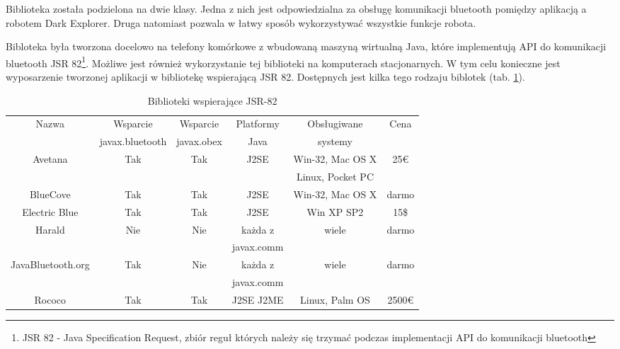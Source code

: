 Biblioteka została podzielona na dwie klasy. Jedna z nich jest odpowiedzialna za obsługę komunikacji bluetooth pomiędzy aplikacją a robotem Dark Explorer. Druga natomiast pozwala w łatwy sposób wykorzystywać wszystkie funkcje robota.

Bibloteka była tworzona docelowo na telefony komórkowe z wbudowaną maszyną wirtualną Java, które implementują API do komunikacji bluetooth JSR 82\footnote{JSR 82 - Java Specification Request, zbiór reguł których należy się trzymać podczas implementacji API do komunikacji bluetooth}. Możliwe jest również wykorzystanie tej biblioteki na komputerach stacjonarnych. W tym celu konieczne jest wyposarzenie tworzonej aplikacji w bibliotekę wspierającą JSR 82. Dostępnych jest kilka tego rodzaju biblotek (tab. \ref{tab:JSR82SDK}).

\begin{table}[hb]
  \centering
  \caption{Biblioteki wspierające JSR-82\cite{website:javabluetooth.com}}
  \begin{tabular}{ | c | c | c | c | c | c |} \hline
    Nazwa & Wsparcie & Wsparcie & Platformy & Obsługiwane & Cena \\
    & javax.bluetooth & javax.obex & Java & systemy & \\ \hline
    Avetana & Tak & Tak & J2SE & Win-32, Mac OS X & 25\euro \\
    & & & & Linux, Pocket PC & \\ \hline
    BlueCove & Tak & Tak & J2SE & Win-32, Mac OS X & darmo \\ \hline
    Electric Blue & Tak & Tak & J2SE & Win XP SP2 & 15\$ \\ \hline
    Harald & Nie & Nie & każda z  & wiele & darmo \\
    & & & javax.comm  &  & \\ \hline
    JavaBluetooth.org & Tak & Nie & każda z  & wiele & darmo \\
    & & & javax.comm  &  & \\ \hline
    Rococo & Tak & Tak & J2SE J2ME & Linux, Palm OS & 2500\euro \\ \hline
  \end{tabular}
  \label{tab:JSR82SDK}
\end{table}